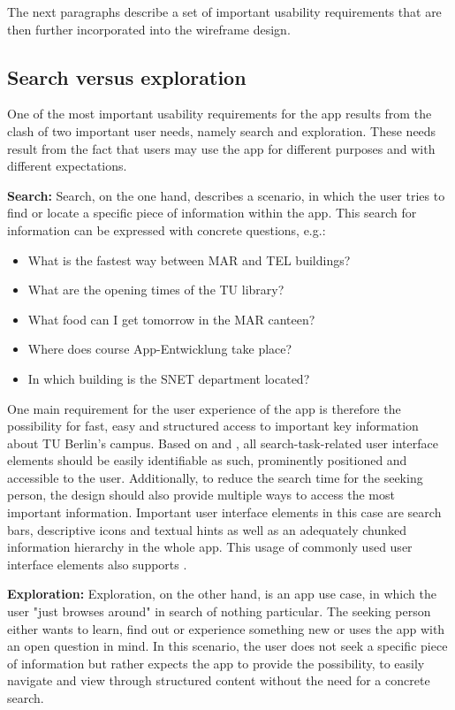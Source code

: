 The next paragraphs describe a set of important usability requirements that are then further incorporated into the wireframe design.

\newpage

\subsection{Search versus exploration}
One of the most important usability requirements for the app results from the clash of two important user needs, namely search and exploration. These needs result from the fact that users may use the app for different purposes and with different expectations.

\textbf{Search:} Search, on the one hand, describes a scenario, in which the user tries to find or locate a specific piece of information within the app. This search for information can be expressed with concrete questions, e.g.:

\begin{itemize}
    \item What is the fastest way between MAR and TEL buildings?
    \item What are the opening times of the TU library?
    \item What food can I get tomorrow in the MAR canteen?
    \item Where does course App-Entwicklung take place?
    \item In which building is the SNET department located?
\end{itemize}

One main requirement for the user experience of the app is therefore the possibility for fast, easy and structured access to important key information about TU Berlin's campus. Based on \cite{fitts_law} and \cite{jakobs_law}, all search-task-related user interface elements should be easily identifiable as such, prominently positioned and accessible to the user. Additionally, to reduce the search time for the seeking person, the design should also provide multiple ways to access the most important information. Important user interface elements in this case are search bars, descriptive icons and textual hints as well as an adequately chunked information hierarchy in the whole app. This usage of commonly used user interface elements also supports \cite{jakobs_law}.

\textbf{Exploration:} Exploration, on the other hand, is an app use case, in which the user "just browses around" in search of nothing particular. The seeking person either wants to learn, find out or experience something new or uses the app with an open question in mind. In this scenario, the user does not seek a specific piece of information but rather expects the app to provide the possibility, to easily navigate and view through structured content without the need for a concrete search.

